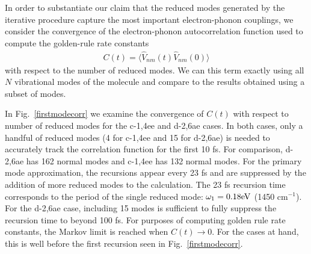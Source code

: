 In order to substantiate our claim that the reduced modes generated by the iterative
procedure capture the most important electron-phonon couplings, we consider the
convergence of the electron-phonon autocorrelation function used
to compute the golden-rule rate constants
\begin{eqnarray}
C(t) = \langle \hat V_{nm}(t) \hat V_{nm}(0)\rangle \label{c-of-t}
\end{eqnarray}
with respect to the number of reduced modes.  We
can  this term exactly using all $N$ vibrational modes of the molecule and
compare to the results obtained using a subset of modes.


In Fig.~\ref{firstmodecorr}  we examine the convergence of $C(t)$ with respect to number of reduced modes for the c-1,4ee and d-2,6ae cases.
In both cases,  only a handful of reduced modes (4 for c-1,4ee and 15 for d-2,6ae)  is needed to  accurately track the
correlation function for the first 10 fs.   For comparison, d-2,6ae has 162 normal modes and c-1,4ee has 132 normal modes.
For the primary mode approximation, the recursions appear every 23 fs
and are suppressed by the addition of more reduced modes to the calculation.
The 23 fs recursion time corresponds to the period of the single reduced mode: $\omega_{1} = 0.18{\rm eV}$ (1450 cm$^{-1}$).
For the d-2,6ae case, including 15 modes is sufficient to fully suppress the recursion time to  beyond 100 fs.
 For purposes of computing golden rule rate constants,  the Markov limit is reached when
 $C(t)\to 0$.   For the cases at hand, this is well before the first recursion seen in Fig.~\ref{firstmodecorr}.

